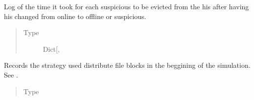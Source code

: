 \documentclass[letterpaper,10pt,english]{sphinxmanual}
\begin{document}
\begin{fulllineitems}
\begin{fulllineitems}
\label{\detokenize{app.domain.helpers:app.domain.helpers.smart_dataclasses.LoggingData.delay_suspects_detection}}
Log of the time it took for each suspicious
{\hyperref[\detokenize{app.domain:module-app.domain.network_nodes}]{}} to be evicted
from the his {\hyperref[\detokenize{app.domain:module-app.domain.cluster_groups}]{}}
after having his {\hyperref[\detokenize{app.domain:app.domain.network_nodes.Node.status}]{}}
changed from online to offline or suspicious.
\begin{quote}\begin{description}
\item[{Type}] \leavevmode
Dict{[}, \sphinxhref{https://docs.python.org/3.7/library/stdtypes.html\#str}{str}{]}

\end{description}\end{quote}

\end{fulllineitems}


\begin{fulllineitems}
\label{\detokenize{app.domain.helpers:app.domain.helpers.smart_dataclasses.LoggingData.initial_spread}}
Records the strategy used distribute file blocks in the
beggining of the simulation. See
{\hyperref[\detokenize{app.domain:app.domain.cluster_groups.Cluster.spread_files}]{}}.
\begin{quote}\begin{description}
\item[{Type}] \leavevmode
{}

\end{description}\end{quote}

\end{fulllineitems}



\end{fulllineitems}
\end{document}
